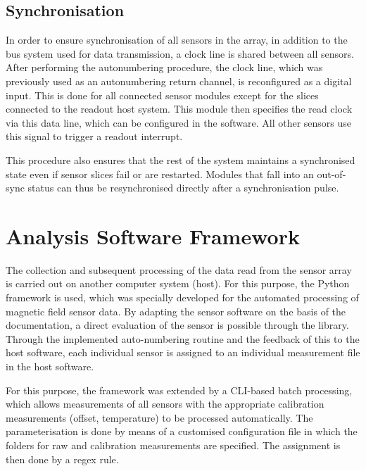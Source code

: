 \documentclass[conference]{IEEEtran}
\begin{document}
    


\subsection{Synchronisation}

In order to ensure synchronisation of all sensors in the array, in addition to the bus system used for data transmission, a clock line is shared between all sensors.
After performing the autonumbering procedure, the clock line, which was previously used as an autonumbering return channel, is reconfigured as a digital input.
This is done for all connected sensor modules except for the slices connected to the readout host system.
This module then specifies the read clock via this data line, which can be configured in the software.
All other sensors use this signal to trigger a readout interrupt.

This procedure also ensures that the rest of the system maintains a synchronised state even if sensor slices fail or are restarted.
Modules that fall into an out-of-sync status can thus be resynchronised directly after a synchronisation pulse.


\section{Analysis Software Framework}

The collection and subsequent processing of the data read from the sensor array is carried out on another computer system (host).
For this purpose, the Python framework is used, which was specially developed for the automated processing of magnetic field sensor data.
By adapting the sensor software on the basis of the documentation, a direct evaluation of the sensor is possible through the library.
Through the implemented auto-numbering routine and the feedback of this to the host software, each individual sensor is assigned to an individual measurement file in the host software.

For this purpose, the framework was extended by a CLI-based batch processing, which allows measurements of all sensors with the appropriate calibration measurements (offset, temperature) to be processed automatically.
The parameterisation is done by means of a customised configuration file in which the folders for raw and calibration measurements are specified.
The assignment is then done by a regex rule.
\end{document}
